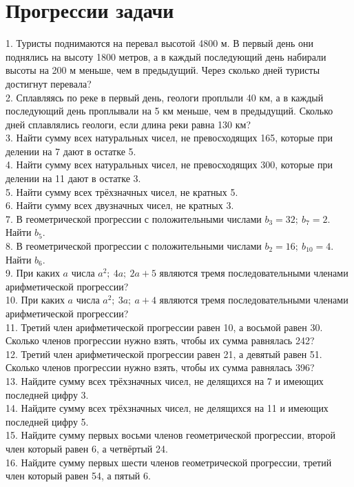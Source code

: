 \documentclass[12pt]{article}
\begin{document}
\section{Прогрессии задачи}
1. Туристы поднимаются на перевал высотой 4800 м. В первый день они поднялись на высоту 1800 метров, а в каждый последующий день набирали высоты на 200 м меньше, чем в предыдущий. Через сколько дней туристы достигнут перевала?\\
2. Сплавляясь по реке в первый день, геологи проплыли 40 км, а в каждый последующий день проплывали на 5 км меньше, чем в предыдущий. Сколько дней сплавлялись геологи, если длина реки равна 130 км?\\
3. Найти сумму всех натуральных чисел, не превосходящих 165, которые при делении на 7 дают в остатке 5.\\
4. Найти сумму всех натуральных чисел, не превосходящих 300, которые при делении на 11 дают в остатке 3.\\
5. Найти сумму всех трёхзначных чисел, не кратных 5.\\
6. Найти сумму всех двузначных чисел, не кратных 3.\\
7. В геометрической прогрессии с положительными числами $b_3=32;\ b_7=2.$ Найти $b_5.$\\
8. В геометрической прогрессии с положительными числами $b_2=16;\ b_{10}=4.$ Найти $b_6.$\\
9. При каких $a$ числа $a^2;\ 4a;\ 2a+5$ являются тремя последовательными членами арифметической прогрессии?\\
10. При каких $a$ числа $a^2;\ 3a;\ a+4$ являются тремя последовательными членами арифметической прогрессии?\\
11. Третий член арифметической прогрессии равен 10, а восьмой равен 30. Сколько членов прогрессии нужно взять, чтобы их сумма равнялась 242?\\
12. Третий член арифметической прогрессии равен 21, а девятый равен 51. Сколько членов прогрессии нужно взять, чтобы их сумма равнялась 396?\\
13. Найдите сумму всех трёхзначных чисел, не делящихся на 7 и имеющих последней цифру 3.\\
14. Найдите сумму всех трёхзначных чисел, не делящихся на 11 и имеющих последней цифру 5.\\
15. Найдите сумму первых восьми членов геометрической прогрессии, второй член который равен 6, а четвёртый 24.\\
16. Найдите сумму первых шести членов геометрической прогрессии, третий член который равен 54, а пятый 6.\\
\end{document}
